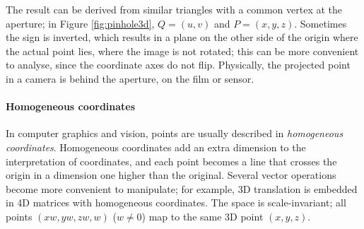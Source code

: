 The result can be derived from similar triangles with a common vertex at the aperture; in Figure \ref{fig:pinhole3d}, $Q = (u, v)$ and $P = (x, y, z)$.
Sometimes the sign is inverted, which results in a plane on the other side of the origin where the actual point lies, where the image is not rotated; this can be more convenient to analyse, since the coordinate axes do not flip.
Physically, the projected point in a camera is behind the aperture, on the film or sensor.

%



\paragraph{Homogeneous coordinates}
In computer graphics and vision, points are usually described in \emph{homogeneous coordinates}.
Homogeneous coordinates add an extra dimension to the interpretation of coordinates, and each point becomes a line that crosses the origin in a dimension one higher than the original.
Several vector operations become more convenient to manipulate; for example, 3D translation is embedded in 4D matrices with homogeneous coordinates. \cite{hartley03multiview,heyden2005multiple}
The space is scale-invariant; all points $(xw, yw, zw, w)$ ($w \neq 0$) map to the same 3D point $(x, y, z)$.
\cite{dubrofsky2009homography,hartley03multiview}

